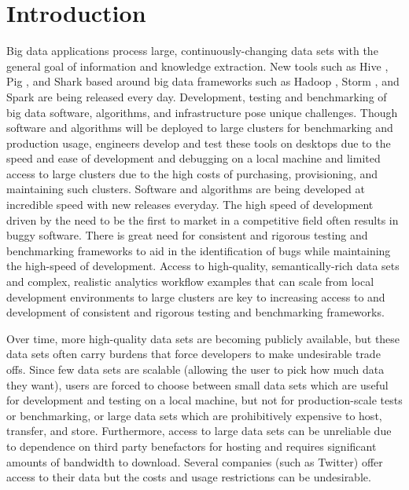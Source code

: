 \documentclass[conference]{IEEEtran}
\begin{document}
\section{Introduction}
Big data applications process large, continuously-changing data sets with the general goal of information and knowledge extraction.  New tools such as Hive \cite{Thusoo2010}, Pig \cite{Olston2008,Gates2009}, and Shark \cite{Engle2012} based around big data frameworks such as Hadoop \cite{Hadoop}, Storm \cite{Storm}, and Spark \cite{Zaharia2010,Zaharia2012} are being released every day. Development, testing and benchmarking of big data software, algorithms, and infrastructure pose unique challenges.  Though software and algorithms will be deployed to large clusters for benchmarking and production usage, engineers develop and test these tools on desktops due to the speed and ease of development and debugging on a local machine and limited access to large clusters due to the high costs of purchasing, provisioning, and maintaining such clusters.  Software and algorithms are being developed at incredible speed with new releases everyday. The high speed of development driven by the need to be the first to market in a competitive field often results in buggy software.  There is great need for consistent and rigorous testing and benchmarking frameworks to aid in the identification of bugs while maintaining the high-speed of development.  Access to high-quality, semantically-rich data sets and complex, realistic analytics workflow examples that can scale from local development environments to large clusters are key to increasing access to and development of consistent and rigorous testing and benchmarking frameworks.

Over time, more high-quality data sets are becoming publicly available, but these data sets often carry burdens that force developers to make undesirable trade offs. Since few data sets are scalable (allowing the user to pick how much data they want), users are forced to choose between small data sets which are useful for development and testing on a local machine, but not for production-scale tests or benchmarking, or large data sets which are prohibitively expensive to host, transfer, and store. Furthermore, access to large data sets can be unreliable due to dependence on third party benefactors for hosting and requires significant amounts of bandwidth to download.  Several companies (such as Twitter\cite{Twitter}) offer access to their data but the costs and usage restrictions can be undesirable.
\end{document}
